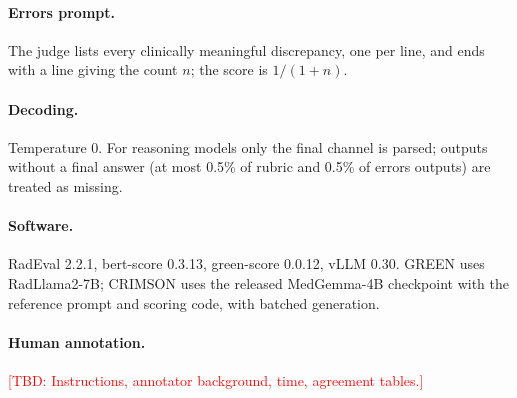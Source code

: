 \documentclass[11pt]{article}
\newcommand{\tbd}[1]{\textcolor{red}{[TBD: #1]}}
\begin{document}
\paragraph{Errors prompt.} The judge lists every clinically meaningful discrepancy, one per line, and ends with a line giving the count $n$; the score is $1/(1+n)$.

\paragraph{Decoding.} Temperature 0. For reasoning models only the final channel is parsed; outputs without a final answer (at most 0.5\% of rubric and 0.5\% of errors outputs) are treated as missing.

\paragraph{Software.} RadEval 2.2.1, bert-score 0.3.13, green-score 0.0.12, vLLM 0.30. GREEN uses RadLlama2-7B; CRIMSON uses the released MedGemma-4B checkpoint with the reference prompt and scoring code, with batched generation.

\paragraph{Human annotation.} \tbd{Instructions, annotator background, time, agreement tables.}
\end{document}

